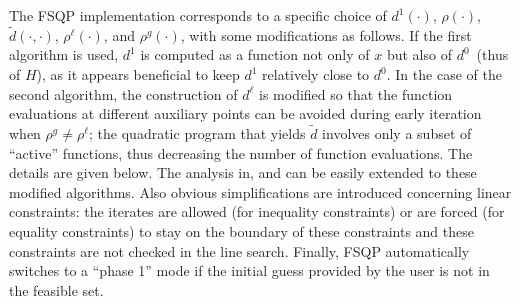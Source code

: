 The FSQP implementation corresponds to a specific choice of
$d^1(\cdot)$, $\rho(\cdot)$, $\tilde{d}(\cdot,\cdot)$, 
$\rho^\ell(\cdot)$, and $\rho^g(\cdot)$,
with some modifications as follows. If the first algorithm
is used, $d^1$ is computed as 
a function not only of $x$ but also of $d^0$~(thus of $H$), as it
appears beneficial to keep $d^1$ relatively close to $d^0$.
In the case of the second algorithm, the construction
of $d^{\ell}$ is modified so that the function
evaluations at different auxiliary points can 
be avoided during early iteration 
when $\rho ^g\neq \rho ^{\ell}$; 
the quadratic program that yields $\tilde{d}$ involves only a 
subset of ``active'' functions, thus decreasing the number
of function evaluations.
The details are given below.
The analysis in\Lspace {}\Rcitemark \Rspace{},
\Rcitemark \Rspace{} and\Lspace {}\Rcitemark \Rspace{}
can be easily extended  to these modified algorithms.
Also obvious simplifications are introduced concerning
linear constraints: the iterates are allowed (for inequality constraints)
or are forced (for equality constraints) to stay
on the boundary of these constraints and these constraints
are not checked in the line search. Finally, FSQP automatically switches to
a ``phase 1'' mode if the initial guess provided by 
the user is not in the feasible set.

